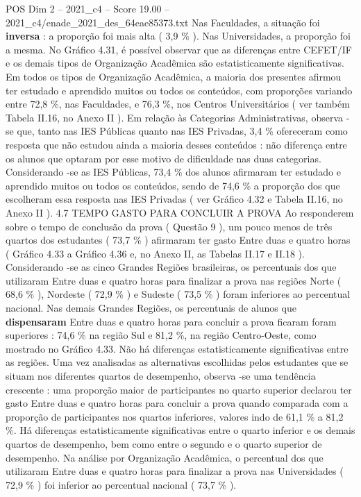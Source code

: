 \begin{textsample}{POS Dim 2 – 2021\_c4 – Score 19.00 – 2021\_c4/enade\_2021\_des\_64eae85373.txt}
Nas Faculdades, a situação foi \textbf{inversa} : a proporção foi mais alta ( 3,9 \% ).
Nas Universidades, a proporção foi a mesma.
No Gráfico 4.31, é possível observar que as diferenças entre CEFET/IF e os demais tipos de Organização Acadêmica são estatisticamente significativas.
Em todos os tipos de Organização Acadêmica, a maioria dos presentes afirmou ter estudado e aprendido muitos ou todos os conteúdos, com proporções variando entre 72,8 \%, nas Faculdades, e 76,3 \%, nos Centros Universitários ( ver também Tabela II.16, no Anexo II ).
Em relação às Categorias Administrativas, observa -se que, tanto nas IES Públicas quanto nas IES Privadas, 3,4 \% ofereceram como resposta que não estudou ainda a maioria desses conteúdos : não diferença entre os alunos que optaram por esse motivo de dificuldade nas duas categorias.
Considerando -se as IES Públicas, 73,4 \% dos alunos afirmaram ter estudado e aprendido muitos ou todos os conteúdos, sendo de 74,6 \% a proporção dos que escolheram essa resposta nas IES Privadas ( ver Gráfico 4.32 e Tabela II.16, no Anexo II ). 4.7 TEMPO GASTO PARA CONCLUIR A PROVA Ao responderem sobre o tempo de conclusão da prova ( Questão 9 ), um pouco menos de três quartos dos estudantes ( 73,7 \% ) afirmaram ter gasto Entre duas e quatro horas ( Gráfico 4.33 a Gráfico 4.36 e, no Anexo II, as Tabelas II.17 e II.18 ).
Considerando -se as cinco Grandes Regiões brasileiras, os percentuais dos que utilizaram Entre duas e quatro horas para finalizar a prova nas regiões Norte ( 68,6 \% ), Nordeste ( 72,9 \% ) e Sudeste ( 73,5 \% ) foram inferiores ao percentual nacional.
Nas demais Grandes Regiões, os percentuais de alunos que \textbf{dispensaram} Entre duas e quatro horas para concluir a prova ficaram foram superiores : 74,6 \% na região Sul e 81,2 \%, na região Centro-Oeste, como mostrado no Gráfico 4.33.
Não há diferenças estatisticamente significativas entre as regiões.
Uma vez analisadas as alternativas escolhidas pelos estudantes que se situam nos diferentes quartos de desempenho, observa -se uma tendência crescente : uma proporção maior de participantes no quarto superior declarou ter gasto Entre duas e quatro horas para concluir a prova quando comparada com a proporção de participantes nos quartos inferiores, valores indo de 61,1 \% a 81,2 \%.
Há diferenças estatisticamente significativas entre o quarto inferior e os demais quartos de desempenho, bem como entre o segundo e o quarto superior de desempenho.
Na análise por Organização Acadêmica, o percentual dos que utilizaram Entre duas e quatro horas para finalizar a prova nas Universidades ( 72,9 \% ) foi inferior ao percentual nacional ( 73,7 \% ).

\end{textsample}
